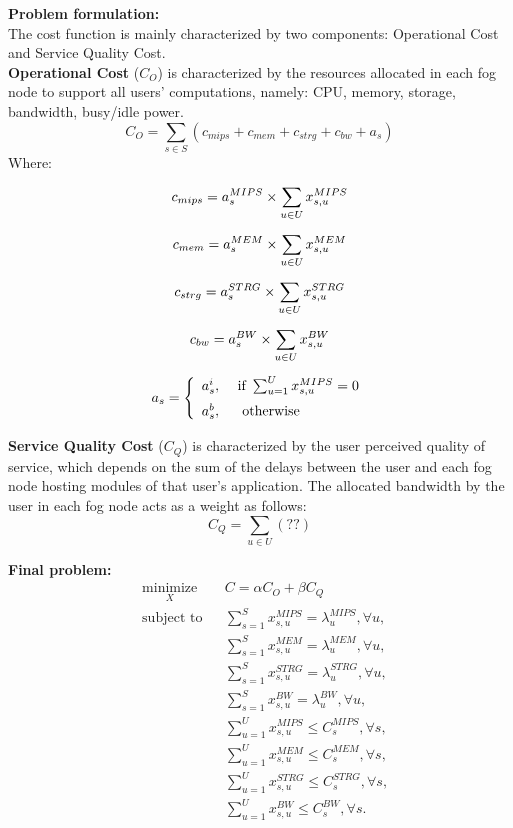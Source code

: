 \documentclass{article}
\begin{document}
\pagebreak
\noindent\textbf{Problem formulation:}\\[6pt]
The cost function is mainly characterized by two components: Operational Cost and Service Quality Cost.\\[6pt]

\noindent\textbf{Operational Cost} ($C_O$) is characterized by the resources allocated in each fog node to support all users' computations, namely: CPU, memory, storage, bandwidth, busy/idle power.
\begin{equation}
C_O = \sum_{s \in S} \left( c_{mips} + c_{mem} + c_ {strg} + c_{bw} + a_{s}\right)
\end{equation}
Where:

\begin{gather}
c_{mips} = a^{MIPS}_{s} \times \sum_{u \in U} x^{MIPS}_{s,u}\\[6pt]
c_{mem} =  a^{MEM}_{s} \times \sum_{u \in U} x^{MEM}_{s,u}\\[6pt]
c_ {strg} =  a^{STRG}_{s} \times \sum_{u \in U} x^{STRG}_{s,u}\\[6pt]
c_{bw} = a^{BW}_{s} \times \sum_{u \in U} x^{BW}_{s,u}\\[6pt]
a_{s} = \left\{ \begin{array}{ll} a^i_{s}, & \text{ if }\sum_{u=1}^Ux^{MIPS}_{s,u} = 0 \\[6pt]
a^b_{s}, & \text{ \text{ otherwise } } \end{array} \right.
\end{gather}

\vspace{12pt}
\noindent\textbf{Service Quality Cost} ($C_Q$) is characterized by the user perceived quality of service, which depends on the sum of the delays between the user and each fog node hosting modules of that user's application. The allocated bandwidth by the user in each fog node acts as a weight as follows:
\begin{equation}
C_Q = \sum_{u \in U} \left( ?? \right)
\end{equation}

\noindent\textbf{Final problem:}\\[6pt]
\begin{equation*}
\begin{aligned}
& \underset{X}{\text{minimize}}
& & C = \alpha C_O + \beta C_Q \\
& \text{subject to}
& & \sum_{s=1}^{S} x^{MIPS}_{s,u} = \lambda^{MIPS}_{u}, \forall u, \\
&&& \sum_{s=1}^{S} x^{MEM}_{s,u} = \lambda^{MEM}_{u}, \forall u, \\
&&& \sum_{s=1}^{S} x^{STRG}_{s,u} = \lambda^{STRG}_{u}, \forall u, \\
&&& \sum_{s=1}^{S}x^{BW}_{s,u} = \lambda^{BW}_{u}, \forall u, \\
&&& \sum_{u=1}^U x^{MIPS}_{s,u} \leq C^{MIPS}_{s}, \forall s, \\
&&& \sum_{u=1}^U x^{MEM}_{s,u} \leq C^{MEM}_{s}, \forall s, \\
&&& \sum_{u=1}^U x^{STRG}_{s,u} \leq C^{STRG}_{s}, \forall s, \\
&&& \sum_{u=1}^U x^{BW}_{s,u} \leq C^{BW}_{s}, \forall s.
\end{aligned}
\end{equation*}
\end{document}
